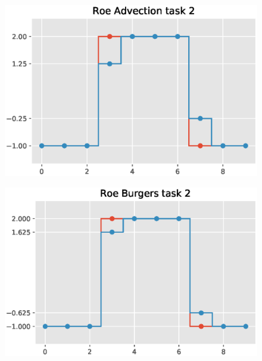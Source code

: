 \documentclass{article}
\begin{document}
 \begin{figure}[H]
  \centering
  \includegraphics[width=1\linewidth]{pics/Roeadvection2.eps}
  \label{fig:perf}
 \end{figure}

 \begin{figure}[H]
  \centering
  \includegraphics[width=1\linewidth]{pics/Roeburgers2.eps}
  \label{fig:perf}
 \end{figure}
\end{document}
